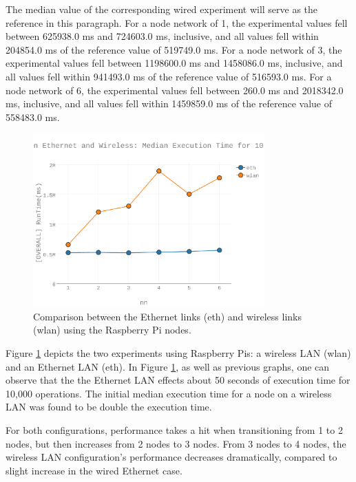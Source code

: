 The median value of the corresponding wired experiment will serve as the reference in this paragraph. For a node network of 1, the experimental values fell between 625938.0 ms and 724603.0 ms, inclusive, and all values fell within 204854.0 ms of the reference value of 519749.0 ms.  For a node network of 3, the experimental values fell between 1198600.0 ms and 1458086.0 ms, inclusive, and all values fell within 941493.0 ms of the reference value of 516593.0 ms.  For a node network of 6, the experimental values fell between 260.0 ms and 2018342.0 ms, inclusive, and all values fell within 1459859.0 ms of the reference value of 558483.0 ms.  

\begin{figure}[h]
\includegraphics[width=3.5in]{Figures/figures-wle_fig7.pdf}

\caption{Comparison between the Ethernet links (eth) and wireless links (wlan) using the Raspberry Pi nodes.}

\label{fig:fig07}
\end{figure}

Figure \ref{fig:fig07} depicts the two experiments using Raspberry Pis: a wireless LAN (wlan) and an Ethernet LAN (eth).  In Figure \ref{fig:fig07}, as well as previous graphs, one can observe that the the Ethernet LAN effects about 50 seconds of execution time for 10,000 operations.  The initial median execution time for a node on a wireless LAN was found to be double the execution time.

For both configurations, performance takes a hit when transitioning from 1 to 2 nodes, but then increases from 2 nodes to 3 nodes.  From 3 nodes to 4 nodes, the wireless LAN configuration’s performance decreases dramatically, compared to slight increase in the wired Ethernet case.  

